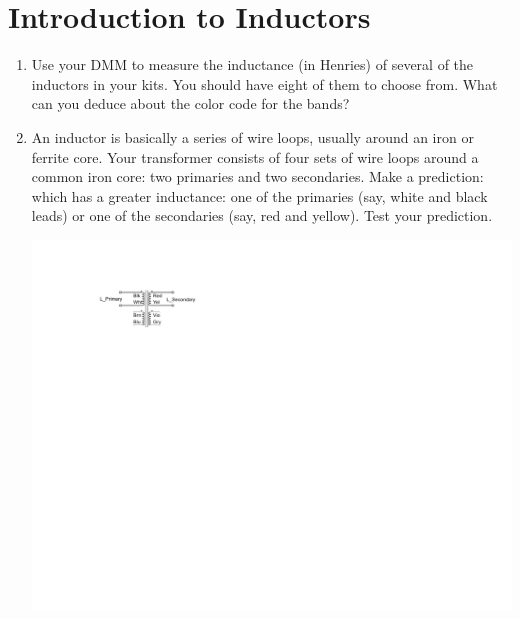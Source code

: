 \section{Introduction to Inductors}
\label{lab_inductors}


\bigskip

\begin{enumerate}[wide]

\item Use your DMM to measure the inductance (in Henries) of several of the inductors in your kits.  You should have eight of them to choose from.  What can you deduce about the color code for the bands?

\item An inductor is basically a series of wire loops, usually around an iron or ferrite core.  Your transformer consists of four sets of wire loops around a common iron core: two primaries and two secondaries.  Make a prediction: which has a greater inductance: one of the primaries (say, white and black leads) or one of the secondaries (say, red and yellow).  Test your prediction.
\begin{center}
\includegraphics{inductors/transformer_as_inductor1.pdf}
\end{center}


\end{enumerate}
